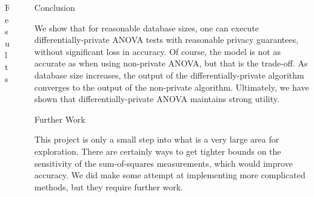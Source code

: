 \documentclass[final]{beamer}
\newlength{\sepwid}
\newlength{\onecolwid}
\newlength{\twocolwid}
\begin{document}
\begin{frame}[t]
\begin{columns}[t]
\begin{column}{\twocolwid}
\begin{block}{Results}
\end{block}




\end{column} %


\begin{column}{\sepwid}\end{column} %

\begin{column}{\onecolwid} %


\begin{block}{Conclusion}

We show that for reasonable database sizes, one can execute differentially-private ANOVA 
tests with reasonable privacy guarantees, without significant loss in accuracy. Of course,
the model is not as accurate as when using non-private ANOVA, but that is the trade-off. As 
database size increases, the output of the differentially-private algorithm converges to 
the output of the non-private algorithm. Ultimately, we have shown that differentially-private ANOVA maintains strong utility.

\end{block}


\begin{block}{Further Work}

This project is only a small step into what is a very large area for exploration. There are 
certainly ways to get tighter bounds on the sensitivity of the sum-of-squares measurements, 
which would improve accuracy. We did make some attempt at implementing more complicated 
methods, but they require further work.

\end{block}


\end{column}
\end{columns}
\end{frame}
\end{document}
